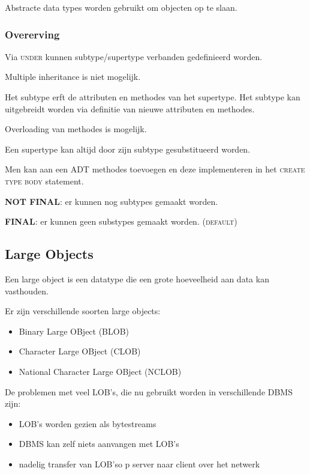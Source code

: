 \documentclass[a4paper,12pt]{article}
\begin{document}
Abstracte data types worden gebruikt om objecten op te slaan.

\subsubsection{Overerving}
Via \textsc{under} kunnen subtype/supertype verbanden gedefinieerd worden.

Multiple inheritance is niet mogelijk.

Het subtype erft de attributen en methodes van het supertype.
Het subtype kan uitgebreidt worden via definitie van nieuwe attributen en methodes.

Overloading van methodes is mogelijk.

Een supertype kan altijd door zijn subtype gesubstitueerd worden.

Men kan aan een \textsc{ADT} methodes toevoegen en deze implementeren in het \textsc{create type body} statement.

\textbf{NOT FINAL}: er kunnen nog subtypes gemaakt worden.

\textbf{FINAL}: er kunnen geen substypes gemaakt worden. (\textsc{default})

\subsection{Large Objects}
Een large object is een datatype die een grote hoeveelheid aan data kan vasthouden.

Er zijn verschillende soorten large objects:
\begin{itemize}
\item Binary Large OBject (BLOB)
\item Character Large OBject (CLOB)
\item National Character Large OBject (NCLOB)
\end{itemize}

De problemen met veel LOB's, die nu gebruikt worden in verschillende DBMS zijn:
\begin{itemize}
\item LOB's worden gezien als bytestreams
\item DBMS kan zelf niets aanvangen met LOB's
\item nadelig transfer van LOB'so p server naar client over het netwerk
\end{itemize}
\end{document}
